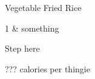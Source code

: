 \begin{recipe}
[ %
    preparationtime = {\unit[35]{m}},
    portion = {\portion{4}},
    calory={???},
]
{Vegetable Fried Rice}
    
    \graph
    {%
    }
    
    \ingredients
    {%
        1     & something
    }
    
    \preparation
    {%
        \step Step here
    }      
    
    \hint
    {%
        ??? calories per thingie
    }

\end{recipe}